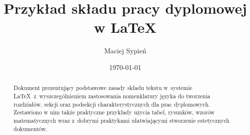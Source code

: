 \documentclass[12pt, oneside, a4paper, franc]{report}
\title{Przykład składu pracy dyplomowej w \LaTeX}
\author{Maciej Sypień}
\date{\today}
\begin{document}
\maketitle

\begin{abstract}
Dokument prezentujący podstawowe zasady składu tekstu w~systemie \LaTeX\ z~wyszczególnieniem zastosowania nomenklatury języka do tworzenia rozdziałów, sekcji oraz podsekcji charakterystycznych dla prac dyplomowych. \\
Zestawiono w nim także praktyczne przykłady użycia tabel, rysunków, wzorów matematycznych wraz z~dobrymi praktykami ułatwiającymi stworzenie estetycznych dokumentów. \\
\end{abstract}




\end{document}
